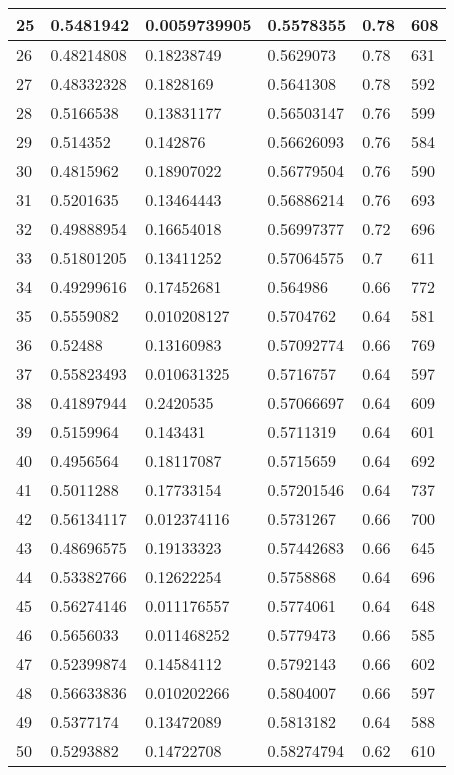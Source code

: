 \begin{longtable}{|l|l|l|l|l|l|}
25 & 0.5481942 & 0.0059739905 & 0.5578355 & 0.78 & 608 \\ \hline 
26 & 0.48214808 & 0.18238749 & 0.5629073 & 0.78 & 631 \\ \hline 
27 & 0.48332328 & 0.1828169 & 0.5641308 & 0.78 & 592 \\ \hline 
28 & 0.5166538 & 0.13831177 & 0.56503147 & 0.76 & 599 \\ \hline 
29 & 0.514352 & 0.142876 & 0.56626093 & 0.76 & 584 \\ \hline 
30 & 0.4815962 & 0.18907022 & 0.56779504 & 0.76 & 590 \\ \hline 
31 & 0.5201635 & 0.13464443 & 0.56886214 & 0.76 & 693 \\ \hline 
32 & 0.49888954 & 0.16654018 & 0.56997377 & 0.72 & 696 \\ \hline 
33 & 0.51801205 & 0.13411252 & 0.57064575 & 0.7 & 611 \\ \hline 
34 & 0.49299616 & 0.17452681 & 0.564986 & 0.66 & 772 \\ \hline 
35 & 0.5559082 & 0.010208127 & 0.5704762 & 0.64 & 581 \\ \hline 
36 & 0.52488 & 0.13160983 & 0.57092774 & 0.66 & 769 \\ \hline 
37 & 0.55823493 & 0.010631325 & 0.5716757 & 0.64 & 597 \\ \hline 
38 & 0.41897944 & 0.2420535 & 0.57066697 & 0.64 & 609 \\ \hline 
39 & 0.5159964 & 0.143431 & 0.5711319 & 0.64 & 601 \\ \hline 
40 & 0.4956564 & 0.18117087 & 0.5715659 & 0.64 & 692 \\ \hline 
41 & 0.5011288 & 0.17733154 & 0.57201546 & 0.64 & 737 \\ \hline 
42 & 0.56134117 & 0.012374116 & 0.5731267 & 0.66 & 700 \\ \hline 
43 & 0.48696575 & 0.19133323 & 0.57442683 & 0.66 & 645 \\ \hline 
44 & 0.53382766 & 0.12622254 & 0.5758868 & 0.64 & 696 \\ \hline 
45 & 0.56274146 & 0.011176557 & 0.5774061 & 0.64 & 648 \\ \hline 
46 & 0.5656033 & 0.011468252 & 0.5779473 & 0.66 & 585 \\ \hline 
47 & 0.52399874 & 0.14584112 & 0.5792143 & 0.66 & 602 \\ \hline 
48 & 0.56633836 & 0.010202266 & 0.5804007 & 0.66 & 597 \\ \hline 
49 & 0.5377174 & 0.13472089 & 0.5813182 & 0.64 & 588 \\ \hline 
50 & 0.5293882 & 0.14722708 & 0.58274794 & 0.62 & 610 \\ \hline 
\end{longtable}